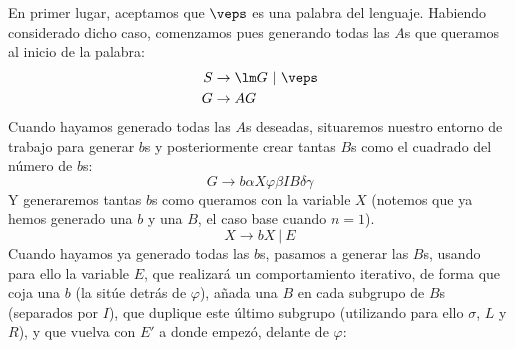 \begin{ejercicio}
\begin{enumerate}
            En primer lugar, aceptamos que $\veps$ es una palabra del lenguaje. Habiendo considerado dicho caso, comenzamos pues generando todas las $A$s que queramos al inicio de la palabra:
            \begin{align*}
                S &\rightarrow \lm G\ |\ \veps \\
                G &\rightarrow AG
            \end{align*}
            Cuando hayamos generado todas las $A$s deseadas, situaremos nuestro entorno de trabajo para generar $b$s y posteriormente crear tantas $B$s como el cuadrado del número de $b$s:
            \begin{equation*}
                G \rightarrow b\alpha X\varphi\beta IB\delta\gamma
            \end{equation*}
            Y generaremos tantas $b$s como queramos con la variable $X$ (notemos que ya hemos generado una $b$ y una $B$, el caso base cuando $n = 1$).
            \begin{equation*}
                X \rightarrow bX\ |\ E
            \end{equation*}
            Cuando hayamos ya generado todas las $b$s, pasamos a generar las $B$s, usando para ello la variable $E$, que realizará un comportamiento iterativo, de forma que coja una $b$ (la sitúe detrás de $\varphi$), añada una $B$ en cada subgrupo de $B$s (separados por $I$), que duplique este último subgrupo (utilizando para ello $\sigma$, $L$ y $R$), y que vuelva con $E'$ a donde empezó, delante de $\varphi$:


\end{enumerate}
\end{ejercicio}
